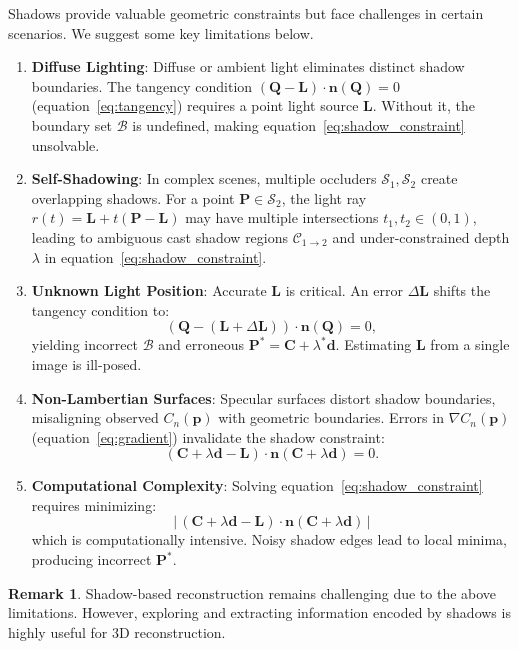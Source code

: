 \documentclass[12pt]{article}
\newcommand{\vect}[1]{\bm{#1}}
\newcommand{\abs}[1]{\left|\,#1\,\right|}
\theoremstyle{definition}
\newtheorem{remark}{Remark}[section]
\begin{document}
Shadows provide valuable geometric constraints but face challenges in certain scenarios. We suggest some key limitations below.
\begin{enumerate}[label=\arabic*.]
    \item \textbf{Diffuse Lighting}: Diffuse or ambient light eliminates distinct shadow boundaries. The tangency condition $(\vect{Q} - \vect{L}) \cdot \vect{n}(\vect{Q}) = 0$ (equation~\eqref{eq:tangency}) requires a point light source $\vect{L}$. Without it, the boundary set $\mathcal{B}$ is undefined, making equation~\eqref{eq:shadow_constraint} unsolvable.
    
    \item \textbf{Self-Shadowing}: In complex scenes, multiple occluders $\mathcal{S}_1, \mathcal{S}_2$ create overlapping shadows. For a point $\vect{P} \in \mathcal{S}_2$, the light ray $r(t) = \vect{L} + t(\vect{P} - \vect{L})$ may have multiple intersections $t_1, t_2 \in (0,1)$, leading to ambiguous cast shadow regions $\mathcal{C}_{1 \to 2}$ and under-constrained depth $\lambda$ in equation~\eqref{eq:shadow_constraint}.
    
    \item \textbf{Unknown Light Position}: Accurate $\vect{L}$ is critical. An error $\Delta \vect{L}$ shifts the tangency condition to:
    \[
    (\vect{Q} - (\vect{L} + \Delta \vect{L})) \cdot \vect{n}(\vect{Q}) = 0,
    \]
    yielding incorrect $\mathcal{B}$ and erroneous $\vect{P}^* = \vect{C} + \lambda^* \vect{d}$. Estimating $\vect{L}$ from a single image is ill-posed.
    
    \item \textbf{Non-Lambertian Surfaces}: Specular surfaces distort shadow boundaries, misaligning observed $C_n(\vect{p})$ with geometric boundaries. Errors in $\nabla C_n(\vect{p})$ (equation~\eqref{eq:gradient}) invalidate the shadow constraint:
    \[
    (\vect{C} + \lambda \vect{d} - \vect{L}) \cdot \vect{n}(\vect{C} + \lambda \vect{d}) = 0.
    \]
    
    \item \textbf{Computational Complexity}: Solving equation~\eqref{eq:shadow_constraint} requires minimizing:
        \[\abs{(\vect{C} + \lambda \vect{d} - \vect{L}) \cdot \vect{n}(\vect{C} + \lambda \vect{d})}\]
        which is computationally intensive. Noisy shadow edges lead to local minima, producing incorrect $\vect{P}^*$.
\end{enumerate}

\begin{remark}
Shadow-based reconstruction remains challenging due to the above limitations. However, exploring and extracting information encoded by shadows is highly useful for 3D reconstruction.
\end{remark}
\end{document}
